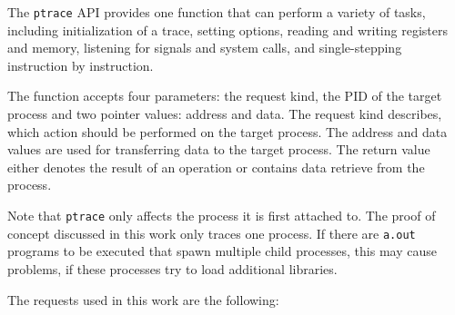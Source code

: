 \documentclass{article}
\begin{document}
The \texttt{ptrace} API provides one function that can perform a variety of tasks, including initialization of a trace, setting options, reading and writing registers and memory, listening for signals and system calls, and single-stepping instruction by instruction.

The function accepts four parameters: the request kind, the PID of the target process and two pointer values: address and data. The request kind describes, which action should be performed on the target process. The address and data values are used for transferring data to the target process. The return value either denotes the result of an operation or contains data retrieve from the process.

Note that \texttt{ptrace} only affects the process it is first attached to. The proof of concept discussed in this work only traces one process. If there are \texttt{a.out} programs to be executed that spawn multiple child processes, this may cause problems, if these processes try to load additional libraries.

The requests used in this work are the following:
\end{document}
